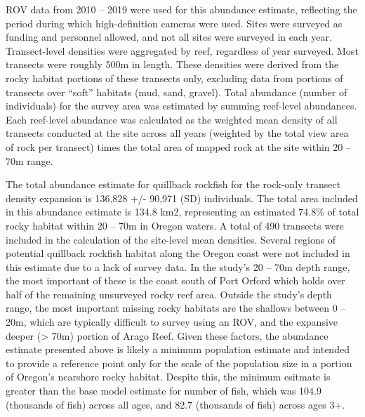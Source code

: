 \documentclass[11pt,
  english,
  a4paper,
]{article}
\begin{document}
\leavevmode\tagmcend\tagstructend\par


ROV data from 2010 -- 2019 were used for this abundance estimate, reflecting the period during which high-definition cameras were used. Sites were surveyed as funding and personnel allowed, and not all sites were surveyed in each year. Transect-level densities were aggregated by reef, regardless of year surveyed. Most transects were roughly 500m in length. These densities were derived from the rocky habitat portions of these transects only, excluding data from portions of transects over ``soft'' habitats (mud, sand, gravel). Total abundance (number of individuals) for the survey area was estimated by summing reef-level abundances. Each reef-level abundance was calculated as the weighted mean density of all transects conducted at the site across all years (weighted by the total view area of rock per transect) times the total area of mapped rock at the site within 20 -- 70m range.

\leavevmode\tagmcend\tagstructend\par


The total abundance estimate for quillback rockfish for the rock-only transect density expansion is 136,828 +/- 90,971 (SD) individuals. The total area included in this abundance estimate is 134.8 km2, representing an estimated 74.8\% of total rocky habitat within 20 -- 70m in Oregon waters. A total of 490 transects were included in the calculation of the site-level mean densities. Several regions of potential quillback rockfish habitat along the Oregon coast were not included in this estimate due to a lack of survey data. In the study's 20 -- 70m depth range, the most important of these is the coast south of Port Orford which holds over half of the remaining unsurveyed rocky reef area. Outside the study's depth range, the most important missing rocky habitats are the shallows between 0 -- 20m, which are typically difficult to survey using an ROV, and the expansive deeper (\textgreater{} 70m) portion of Arago Reef. Given these factors, the abundance estimate presented above is likely a minimum population estimate and intended to provide a reference point only for the scale of the population size in a portion of Oregon's nearshore rocky habitat. Despite this, the minimum esitmate is greater than the base model estimate for number of fish, which was 104.9 (thousands of fish) across all ages, and 82.7 (thousands of fish) across ages 3+.

\leavevmode\tagmcend\tagstructend\par
\end{document}
